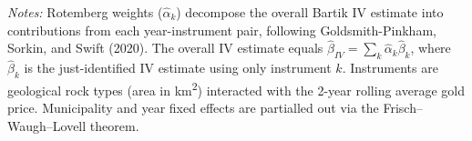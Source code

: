 {\vspace{0.5em}
\begin{center}
\textit{Notes:} Rotemberg weights ($\hat{\alpha}_k$) decompose the overall Bartik IV estimate into contributions from each year-instrument pair, following Goldsmith-Pinkham, Sorkin, and Swift (2020). The overall IV estimate equals $\hat{\beta}_{IV} = \sum_k \hat{\alpha}_k \hat{\beta}_k$, where $\hat{\beta}_k$ is the just-identified IV estimate using only instrument $k$. Instruments are geological rock types (area in km\textsuperscript{2}) interacted with the 2-year rolling average gold price. Municipality and year fixed effects are partialled out via the Frisch--Waugh--Lovell theorem.
\end{center}
}
